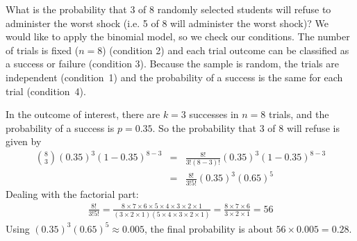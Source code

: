 

















\begin{example}{What is the probability that 3 of 8 randomly selected students will refuse to administer the worst shock (i.e. 5 of 8 will administer the worst shock)?}
We would like to apply the binomial model, so we check our conditions. The number of trials is fixed ($n=8$) (condition 2) and each trial outcome can be classified as a success or failure (condition 3). Because the sample is random, the trials are independent (condition~1) and the probability of a success is the same for each trial (condition~4).

In the outcome of interest, there are $k=3$ successes in $n=8$ trials, and the probability of a success is $p=0.35$. So the probability that 3 of 8 will refuse is given by
\begin{eqnarray*}
{ 8 \choose 3}(0.35)^3(1-0.35)^{8-3}
	&=& \frac{8!}{3!(8-3)!}(0.35)^3(1-0.35)^{8-3} \\
	&=& \frac{8!}{3!5!}(0.35)^3(0.65)^5
\end{eqnarray*}
Dealing with the factorial part:
\begin{eqnarray*}
\frac{8!}{3!5!} = \frac{8\times7\times6\times5\times4\times3\times2\times1}{(3\times2\times1)(5\times4\times3\times2\times1)} = \frac{8\times7\times6}{3\times2\times1} = 56
\end{eqnarray*}
Using $(0.35)^3(0.65)^5 \approx 0.005$, the final probability is about $56 \times 0.005 = 0.28$.
\end{example}

